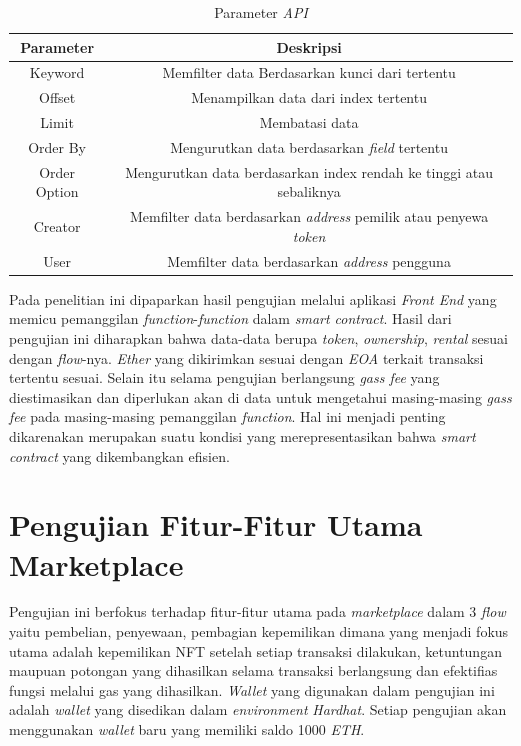 \begin{longtable}{|c|c|}
  \caption{Parameter \emph{API}}
  \label{tb:APIParameters}                                   \\
  \hline
  \rowcolor[HTML]{C0C0C0}
  \textbf{Parameter} &  \textbf{Deskripsi} \\
  \hline
  Keyword            & Memfilter data Berdasarkan kunci dari tertentu                                        \\
  Offset             & Menampilkan data dari index tertentu                           \\
  Limit            & Membatasi data                                                           \\
  Order By            & Mengurutkan data berdasarkan \emph{field} tertentu                                 \\
  Order Option        & Mengurutkan data berdasarkan index rendah ke tinggi atau sebaliknya                              \\
  Creator              & Memfilter data berdasarkan \emph{address} pemilik atau penyewa \emph{token}                                                                             \\
  User          & Memfilter data berdasarkan \emph{address} pengguna \\
  
  \hline
\end{longtable}


Pada penelitian ini dipaparkan hasil pengujian melalui aplikasi \emph{Front End} yang memicu pemanggilan \emph{function}-\emph{function} dalam \emph{smart contract}. Hasil dari pengujian ini diharapkan bahwa data-data berupa \emph{token}, \emph{ownership}, \emph{rental} sesuai dengan \emph{flow}-nya. \emph{Ether} yang dikirimkan sesuai dengan \emph{EOA} terkait transaksi tertentu sesuai. Selain itu selama pengujian berlangsung \emph{gass fee} yang diestimasikan dan diperlukan akan di data untuk mengetahui masing-masing \emph{gass fee} pada masing-masing pemanggilan \emph{function}. Hal ini menjadi penting dikarenakan merupakan suatu kondisi yang merepresentasikan bahwa \emph{smart contract} yang dikembangkan efisien.

\section{Pengujian Fitur-Fitur Utama Marketplace}
\label{sec:skenariopengujian}

Pengujian ini berfokus terhadap fitur-fitur utama pada \emph{marketplace} dalam 3 \emph{flow} yaitu pembelian, penyewaan, pembagian kepemilikan dimana yang menjadi fokus utama adalah kepemilikan NFT setelah setiap transaksi dilakukan, ketuntungan maupuan potongan yang dihasilkan selama transaksi berlangsung dan efektifias fungsi melalui gas yang dihasilkan.  \emph{Wallet} yang digunakan dalam pengujian ini adalah \emph{wallet} yang disedikan dalam \emph{environment} \emph{Hardhat}. Setiap pengujian akan menggunakan \emph{wallet} baru yang memiliki saldo 1000 \emph{ETH}.

